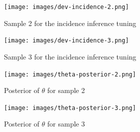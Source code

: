 \documentclass[
  digital, %
  oneside, %
  lof,     %
  lot,     %
]{fithesis4}
\begin{document}
\begin{figure}[h]
  \begin{center}
    \texttt{[image: images/dev-incidence-2.png]}
  \end{center}
  \caption{Sample 2 for the incidence inference tuning}
  \label{fig:dev-incidence-2}
\end{figure}

\begin{figure}[h]
  \begin{center}
    \texttt{[image: images/dev-incidence-3.png]}
  \end{center}
  \caption{Sample 3 for the incidence inference tuning}
  \label{fig:dev-incidence-3}
\end{figure}


\begin{figure}[h]
  \begin{center}
    \texttt{[image: images/theta-posterior-2.png]}
  \end{center}
  \caption{Posterior of $\theta$ for sample 2}
  \label{fig:theta-posterior-2}
\end{figure}

\begin{figure}[h]
  \begin{center}
    \texttt{[image: images/theta-posterior-3.png]}
  \end{center}
  \caption{Posterior of $\theta$ for sample 3}
  \label{fig:theta-posterior-3}
\end{figure}
\end{document}

